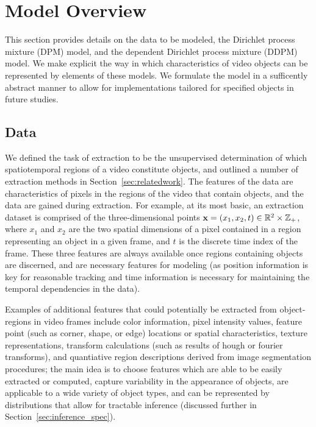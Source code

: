 \documentclass[smallcondensed, final]{svjour3}
\begin{document}
\section{Model Overview}
\label{sec:modeloverview}
%
This section provides details on the data to be modeled, the Dirichlet process mixture (DPM) model, and the dependent Dirichlet process mixture (DDPM) model. We make explicit the way in which characteristics of video objects can be represented by elements of these models. We formulate the model in a sufficently abstract manner to allow for implementations tailored for specified objects in future studies.




\subsection{Data}
\label{sec:data}
%
We defined the task of extraction to be the unsupervised determination of which spatiotemporal regions of a video constitute objects, and outlined a number of extraction methods in Section~\ref{sec:relatedwork}. The features of the data are characteristics of pixels in the regions of the video that contain objects, and the data are gained during extraction. For example, at its most basic, an extraction dataset is comprised of the three-dimensional points $\bold{x} = ( x_{1}, x_{2}, t ) \in \mathbb{R}^{2} \times \mathbb{Z}_{+}$, where $x_{1}$ and $x_{2}$ are the two spatial dimensions of a pixel contained in a region representing an object in a given frame, and $t$ is the discrete time index of the frame. These three features are always available once regions containing objects are discerned, and are necessary features for modeling (as position information is key for reasonable tracking and time information is necessary for maintaining the temporal dependencies in the data).

Examples of additional features that could potentially be extracted from object-regions in video frames include color information, pixel intensity values, feature point (such as corner, shape, or edge) locations or spatial characteristics, texture representations, transform calculations (such as results of hough or fourier transforms), and quantiative region descriptions derived from image segmentation procedures; the main idea is to choose features which are able to be easily extracted or computed, capture variability in the appearance of objects, are applicable to a wide variety of object types, and can be represented by distributions that allow for tractable inference (discussed further in Section~\ref{sec:inference_spec}).
\end{document}
